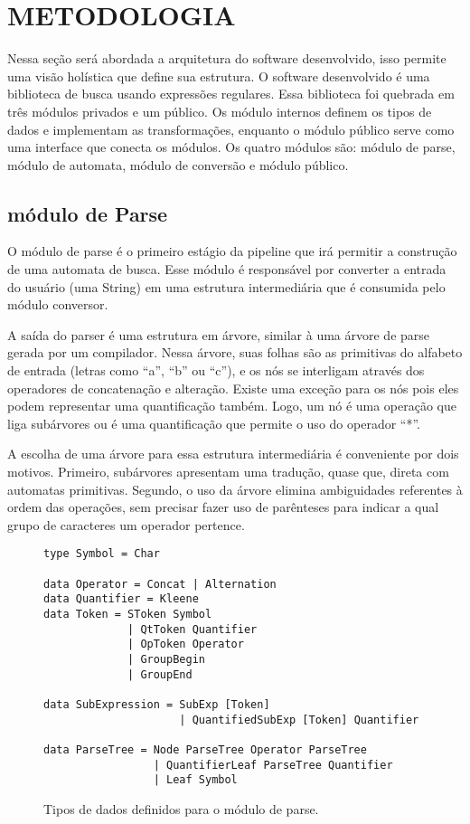 \section{METODOLOGIA}
Nessa seção será abordada a arquitetura do software desenvolvido, isso permite uma visão holística que define sua estrutura.
O software desenvolvido é uma biblioteca de busca usando expressões regulares.
Essa biblioteca foi quebrada em três módulos privados e um público.
Os módulo internos definem os tipos de dados e implementam as transformações, enquanto o módulo público serve como uma interface que conecta os módulos.
Os quatro módulos são: módulo de parse, módulo de automata, módulo de conversão e módulo público.

\subsection{módulo de Parse}

O módulo de parse é o primeiro estágio da pipeline que irá permitir a construção de uma automata de busca.
Esse módulo é responsável por converter a entrada do usuário (uma String) em uma estrutura intermediária que é consumida pelo módulo conversor.

A saída do parser é uma estrutura em árvore, similar à uma árvore de parse gerada por um compilador.
Nessa árvore, suas folhas são as primitivas do alfabeto de entrada (letras como “a”, “b” ou “c”), e os nós se interligam através dos operadores de concatenação e alteração.
Existe uma exceção para os nós pois eles podem representar uma quantificação também.
Logo, um nó é uma operação que liga subárvores ou é uma quantificação que permite o uso do operador “*”.

A escolha de uma árvore para essa estrutura intermediária é conveniente por dois motivos. 
Primeiro, subárvores apresentam uma tradução, quase que, direta com automatas primitivas.
Segundo, o uso da árvore elimina ambiguidades referentes à ordem das operações, sem precisar fazer uso de parênteses para indicar a qual grupo de caracteres um operador pertence.

\begin{figure}
\begin{lstlisting}
type Symbol = Char

data Operator = Concat | Alternation
data Quantifier = Kleene
data Token = SToken Symbol 
             | QtToken Quantifier 
             | OpToken Operator 
             | GroupBegin 
             | GroupEnd

data SubExpression = SubExp [Token] 
                     | QuantifiedSubExp [Token] Quantifier

data ParseTree = Node ParseTree Operator ParseTree 
                 | QuantifierLeaf ParseTree Quantifier 
                 | Leaf Symbol

\end{lstlisting}
\caption{Tipos de dados definidos para o módulo de parse.}
\label{f-data-parse}
\end{figure}



